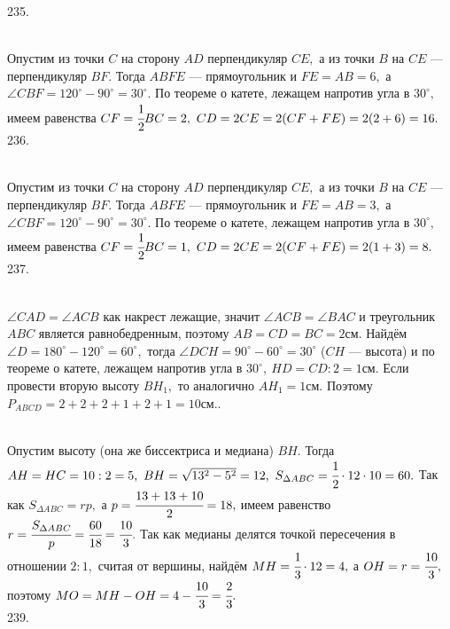 235. \begin{figure}[ht!]
\end{figure}\\
Опустим из точки $C$ на сторону $AD$ перпендикуляр $CE,$ а из точки $B$ на $CE$ --- перпендикуляр $BF.$ Тогда $ABFE$ --- прямоугольник и $FE=AB=6,$ а $\angle CBF=  120^\circ-90^\circ=30^\circ.$ По теореме о катете, лежащем напротив угла в $30^\circ,$ имеем равенства $CF=\cfrac{1}{2}BC=2,\ CD=2CE=2(CF+FE)=2(2+6)=16.$\\
236. \begin{figure}[ht!]
\end{figure}\\
Опустим из точки $C$ на сторону $AD$ перпендикуляр $CE,$ а из точки $B$ на $CE$ --- перпендикуляр $BF.$ Тогда $ABFE$ --- прямоугольник и $FE=AB=3,$ а $\angle CBF=  120^\circ-90^\circ=30^\circ.$ По теореме о катете, лежащем напротив угла в $30^\circ,$ имеем равенства $CF=\cfrac{1}{2}BC=1,\ CD=2CE=2(CF+FE)=2(1+3)=8.$\\
237. \begin{figure}[ht!]
\end{figure}\\
$\angle CAD=\angle ACB$ как накрест лежащие, значит $\angle ACB=\angle BAC$ и треугольник $ABC$ является равнобедренным, поэтому $AB=CD=BC=2$см. Найдём $\angle D=180^\circ-120^\circ=60^\circ,$ тогда $\angle DCH=90^\circ-60^\circ=30^\circ$ ($CH$ --- высота) и по теореме о катете, лежащем напротив угла в $30^\circ,\ HD=CD:2=1$см. Если провести вторую высоту $BH_1,$ то аналогично $AH_1=1$см. Поэтому $P_{ABCD}=2+2+2+1+2+1=10$см.\newpage{}. \begin{figure}[ht!]
\end{figure}\\
Опустим высоту (она же биссектриса и медиана) $BH.$ Тогда $AH=HC=10:2=5,\ BH=\sqrt{13^2-5^2}=12,\ S_{\Delta ABC}=\cfrac{1}{2}\cdot12\cdot10=60.$ Так как $S_{\Delta ABC}=rp,$ а $p=\cfrac{13+13+10}{2}=18,$ имеем равенство $r=\cfrac{S_{\Delta ABC}}{p}=\cfrac{60}{18}=\cfrac{10}{3}.$ Так как медианы делятся точкой пересечения в отношении $2:1,$ считая от вершины, найдём $MH=\cfrac{1}{3}\cdot12=4,$ а $OH=r=\cfrac{10}{3},$ поэтому $MO=MH-OH=4-\cfrac{10}{3}=\cfrac{2}{3}.$\\
239. \begin{figure}[ht!]
\end{figure}\\
